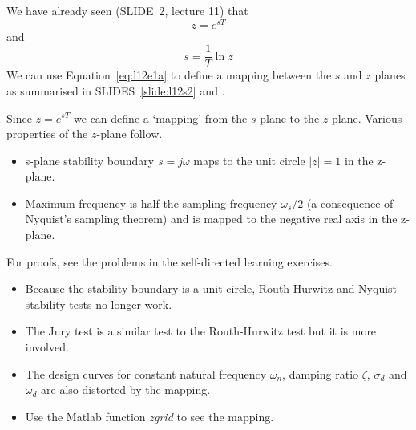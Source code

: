 We have already seen (SLIDE~2, lecture 11) that
\begin{equation}\label{eq:l12e1a}
	z=e^{sT}
\end{equation}
and
\begin{equation}\label{eq:l12e1b}
	s=\frac{1}{T}\ln z
\end{equation}
We can use Equation~\ref{eq:l12e1a} to define a mapping between the $s$ and $z$ planes as summarised in SLIDES~\ref{slide:l12s2} and .
\begin{slide}\label{slide:l12s2}
  Since $z=e^{sT}$ we can define a `mapping' from the $s$-plane to the $z$-plane. Various properties of the $z$-plane follow.
\begin{itemize}
  \item s-plane stability boundary $s=j\omega$ maps to the unit circle $|z|=1$ in the z-plane.
  \item Maximum frequency is half the sampling frequency $\omega_s/2$ (a consequence of Nyquist's sampling theorem) and is mapped to the negative real axis in the z-plane.
\end{itemize}
For proofs, see the problems in the self-directed learning exercises.
\end{slide}

\begin{slide}\label{slide:l12s3}
\begin{itemize}
  \item Because the stability boundary is a unit circle, Routh-Hurwitz and Nyquist stability tests no longer work.
  \item The Jury test is a similar test to the Routh-Hurwitz test but it is more involved.
  \item The design curves for constant natural frequency $\omega_n$, damping ratio $\zeta$, $\sigma_d$ and $\omega_d$ are also distorted by the mapping.
  \item Use the Matlab function \emph{zgrid} to see the mapping.
\end{itemize}
\end{slide}

